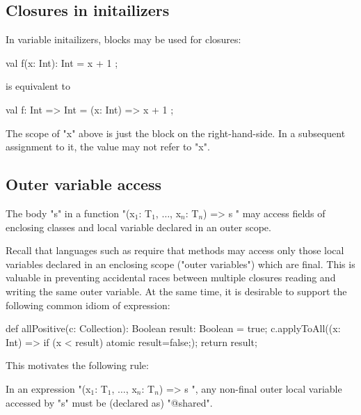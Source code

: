 
\subsection{Closures in initailizers}

In variable initailizers, blocks may be used for closures:

\begin{xten}
val f(x: Int): Int = { x + 1 };
\end{xten}

is equivalent to

\begin{xten}
val f: Int => Int = (x: Int) => { x + 1 };
\end{xten}

The scope of \xcd"x" above is just the block on the
right-hand-side. In a
subsequent assignment to it, the value may not refer to \xcd"x".

\subsection{Outer variable access}

The body \xcd"s" in a function
\xcdmath"(x$_1$: T$_1$, $\dots$, x$_n$: T$_n$) => { s }"
may access fields
of enclosing classes and local variable declared in an outer scope.

Recall that languages such as \java{} require that methods may
access only those local variables declared in an enclosing scope
("outer variables") which are final. This is valuable in
preventing accidental races between multiple closures reading
and writing the same outer variable. At the same time, it is
desirable to support the following common idiom of expression:

\begin{xten}
def allPositive(c: Collection): Boolean {
  result: Boolean = true;
  c.applyToAll((x: Int) => { if (x < result) atomic {result=false;}});
  return result;
}
\end{xten}

This motivates the following rule:

\begin{staticrule*}
In an expression
\xcdmath"(x$_1$: T$_1$, $\dots$, x$_n$: T$_n$) => { s }",
any non-final outer local variable accessed by \xcd"s" must be (declared
as) \xcd"@shared".
\end{staticrule*}

